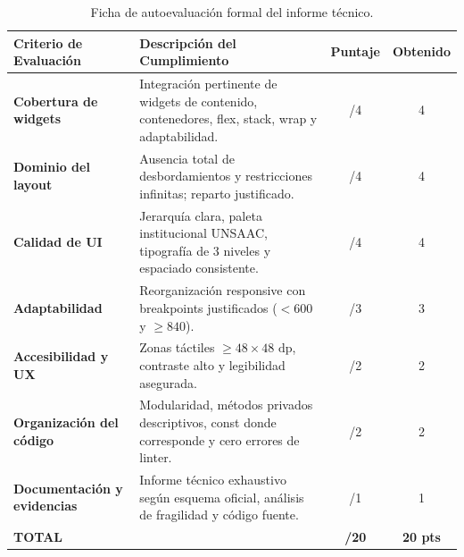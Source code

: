 \documentclass[12pt,a4paper]{article}
\begin{document}
\begin{table}[h!]
\centering
\begin{tabular}{@{}lp{8.5cm}cc@{}}
\toprule
\textbf{Criterio de Evaluación} & \textbf{Descripción del Cumplimiento} & \textbf{Puntaje} & \textbf{Obtenido} \\ \midrule
\textbf{Cobertura de widgets} & Integración pertinente de widgets de contenido, contenedores, flex, stack, wrap y adaptabilidad. & /4 & 4 \\ \addlinespace
\textbf{Dominio del layout} & Ausencia total de desbordamientos y restricciones infinitas; reparto justificado. & /4 & 4 \\ \addlinespace
\textbf{Calidad de UI} & Jerarquía clara, paleta institucional UNSAAC, tipografía de 3 niveles y espaciado consistente. & /4 & 4 \\ \addlinespace
\textbf{Adaptabilidad} & Reorganización responsive con breakpoints justificados ($< 600$ y $\ge 840$). & /3 & 3 \\ \addlinespace
\textbf{Accesibilidad y UX} & Zonas táctiles $\ge 48 \times 48\text{ dp}$, contraste alto y legibilidad asegurada. & /2 & 2 \\ \addlinespace
\textbf{Organización del código} & Modularidad, métodos privados descriptivos, const donde corresponde y cero errores de linter. & /2 & 2 \\ \addlinespace
\textbf{Documentación y evidencias} & Informe técnico exhaustivo según esquema oficial, análisis de fragilidad y código fuente. & /1 & 1 \\ \midrule
\textbf{TOTAL} & & \textbf{/20} & \textbf{20 pts} \\ \bottomrule
\end{tabular}
\caption{Ficha de autoevaluación formal del informe técnico.}
\end{table}
\end{document}
